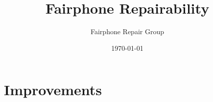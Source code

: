 \documentclass[final,a4paper]{report} %
\author{Fairphone Repair Group}
\title{Fairphone Repairability}
\date{\today}
\begin{document}
	\section{Improvements}
	\label{sec:scrw-it-improvements}
	
\end{document}
